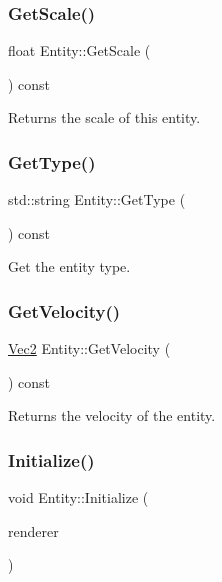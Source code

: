\subsubsection{\texorpdfstring{Get\+Scale()}{GetScale()}}
{\footnotesize\ttfamily float Entity\+::\+Get\+Scale (\begin{DoxyParamCaption}{ }\end{DoxyParamCaption}) const\hspace{0.3cm}{\ttfamily [inline]}}

Returns the scale of this entity. \mbox{\label{class_entity_a906ca5c844298c0258bda83563f925a0}} 
\subsubsection{\texorpdfstring{Get\+Type()}{GetType()}}
{\footnotesize\ttfamily std\+::string Entity\+::\+Get\+Type (\begin{DoxyParamCaption}{ }\end{DoxyParamCaption}) const\hspace{0.3cm}{\ttfamily [inline]}}

Get the entity type. \mbox{\label{class_entity_a020e999dbfc6b04eb7981b1f2496c4f1}} 
\subsubsection{\texorpdfstring{Get\+Velocity()}{GetVelocity()}}
{\footnotesize\ttfamily \mbox{\hyperlink{struct_vec2}{Vec2}} Entity\+::\+Get\+Velocity (\begin{DoxyParamCaption}{ }\end{DoxyParamCaption}) const\hspace{0.3cm}{\ttfamily [inline]}}

Returns the velocity of the entity. \mbox{\label{class_entity_a29ff4d8c00040f1aa281f2e039256543}} 
\subsubsection{\texorpdfstring{Initialize()}{Initialize()}}
{\footnotesize\ttfamily void Entity\+::\+Initialize (\begin{DoxyParamCaption}\item[{S\+D\+L\+\_\+\+Renderer $\ast$}]{renderer }\end{DoxyParamCaption})\hspace{0.3cm}{\ttfamily [virtual]}}

